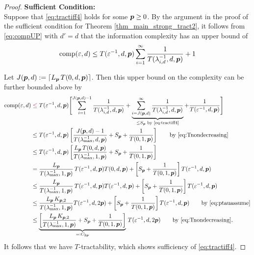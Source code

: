 \documentclass[11pt,a4paper]{article}
\newcommand{\peter}[1]{\begingroup\color{purple}#1\endgroup}
\begin{document}
\begin{proof}
    \textbf{Sufficient Condition:}\\
Suppose that \eqref{eq:tractiff4} holds for some $\boldsymbol{p} \ge 0$. By the argument in the proof of the sufficient condition for Theorem \ref{thm_main_strong_tract2}, it follows from \eqref{eq:compUP} with $d'=d$ that the \peter{information} complexity has an upper bound of
\begin{equation*}
	 \operatorname{comp}(\varepsilon,d) \le  T(\varepsilon^{-1},d,\boldsymbol{p}) \sum_{i=1}^\infty \frac{1}{T(\lambda_{i, d}^{-1},d,\boldsymbol{p})} + 1
\end{equation*}

Let $J(\boldsymbol{p},d): = \lceil L_{\boldsymbol{p}}\, T(0,d,\boldsymbol{p})\rceil$.  Then this upper bound on the complexity can be further bounded above by
\begin{align*}
       \comp(\varepsilon,d)
       & \peter{\le} T(\varepsilon^{-1},d,\vp) \Biggl [ \sum_{i=1}^{J(\vp,d) -1} \frac{1}{T(\lambda_{i, d}^{-1},d,\vp)}
       + \underbrace{\sum_{i=J(\vp,d)}^\infty \frac{1}{T(\lambda_{i, d}^{-1},d,\vp)}}_{\le S_{\vp} \text{ by \eqref{eq:tractiff4}}} 
       + \frac{1}{T(\varepsilon^{-1},d, \vp)} \Biggr ] \\
       & \le T(\varepsilon^{-1},d,\vp)\left[ \frac{J(\vp,d)-1}{T(\lambda_{\max}^{-1},d,\vp)} + S_{\vp} + \frac{1}{T(0,1, \vp)}\right]
       \qquad \text{by \eqref{eq:Tnondecreasing}}  \\
       & \le T(\varepsilon^{-1},d,\vp)\left[\frac{L_{\vp}\, T(0,d,\vp)}{T(\lambda_{\max}^{-1},1,\vp)} + S_{\vp} + \frac{1}{T(0,1, \vp)}\right] \\
       & \peter{=}\frac{L_{\vp}}{T(\lambda_{\max}^{-1},1,\vp)} \,T(\varepsilon^{-1},d,\vp) T(0,d,\vp) + \left [  S_{\vp} + \frac{1}{T(0,1, \vp)}\right] T(\varepsilon^{-1},d,\vp)\\
       & \le\frac{L_{\vp}}{T(\lambda_{\max}^{-1},1,\vp)} \,T(\varepsilon^{-1},d,\vp) T(\varepsilon^{-1},d,\vp) +\left [  S_{\vp} + \frac{1}{T(0,1, \vp)}\right] T(\varepsilon^{-1},d,\vp)\\
       & \le \frac{L_{\vp}\,K_{\vp,2}}{T(\lambda_{\max}^{-1},1,\vp)}  T(\varepsilon^{-1},d,2\vp)  +\left [  S_{\vp} + \frac{1}{T(0,1, \vp)}\right] T(\varepsilon^{-1},d,\vp)  \qquad \text{by \eqref{eq:ptauassume}}\\
       & \le \underbrace{\left[\frac{L_{\vp}\,K_{\vp,2}}{T(\lambda_{\max}^{-1},1,\vp)} + S_{\vp} + \frac{1}{T(0,1, \vp)}\right]}_{=:C_{2\vp}} \,T(\varepsilon^{-1},d,2\vp) \qquad \text{by \eqref{eq:Tnondecreasing}}.
\end{align*}
It follows that we have $T$-tractability, which shows sufficiency of \eqref{eq:tractiff4}.


\end{proof}
\end{document}
